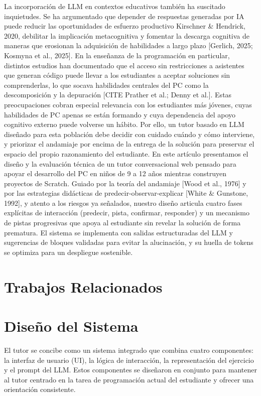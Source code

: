 \documentclass[conference]{IEEEtran}
\begin{document}
La incorporación de LLM en contextos educativos también ha suscitado inquietudes. Se ha argumentado que depender de respuestas generadas por IA puede reducir las oportunidades de esfuerzo productivo Kirschner \& Hendrick, 2020, debilitar la implicación metacognitiva y fomentar la descarga cognitiva de maneras que erosionan la adquisición de habilidades a largo plazo [Gerlich, 2025; Kosmyna et al., 2025]. En la enseñanza de la programación en particular, distintos estudios han documentado que el acceso sin restricciones a asistentes que generan código puede llevar a los estudiantes a aceptar soluciones sin comprenderlas, lo que socava habilidades centrales del PC como la descomposición y la depuración [CITE Prather et al.; Denny et al.]. Estas preocupaciones cobran especial relevancia con los estudiantes más jóvenes, cuyas habilidades de PC apenas se están formando y cuya dependencia del apoyo cognitivo externo puede volverse un hábito. Por ello, un tutor basado en LLM diseñado para esta población debe decidir con cuidado cuándo y cómo interviene, y priorizar el andamiaje por encima de la entrega de la solución para preservar el espacio del propio razonamiento del estudiante.
En este artículo presentamos el diseño y la evaluación técnica de un tutor conversacional web pensado para apoyar el desarrollo del PC en niños de 9 a 12 años mientras construyen proyectos de Scratch. Guiado por la teoría del andamiaje [Wood et al., 1976] y por las estrategias didácticas de predecir-observar-explicar [White \& Gunstone, 1992], y atento a los riesgos ya señalados, nuestro diseño articula cuatro fases explícitas de interacción (predecir, pista, confirmar, responder) y un mecanismo de pistas progresivas que apoya al estudiante sin revelar la solución de forma prematura. El sistema se implementa con salidas estructuradas del LLM y sugerencias de bloques validadas para evitar la alucinación, y su huella de tokens se optimiza para un despliegue sostenible.


\section{Trabajos Relacionados}
\section{Diseño del Sistema}

El tutor se concibe como un sistema integrado que combina cuatro componentes: la interfaz de usuario (UI), la lógica de interacción, la representación del ejercicio y el prompt del LLM. Estos componentes se diseñaron en conjunto para mantener al tutor centrado en la tarea de programación actual del estudiante y ofrecer una orientación consistente.
\end{document}
